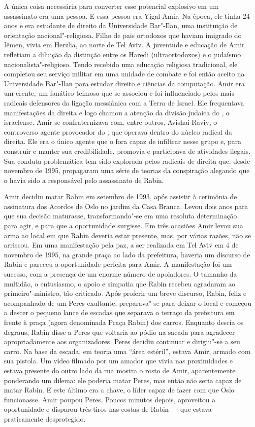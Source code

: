 A única coisa necessária para converter esse potencial explosivo em um
assassinato era uma pessoa. E essa pessoa era Yigal Amir. Na época, ele
tinha 24 anos e era estudante de direito da Universidade
Bar"-Ilan, uma instituição de orientação nacional"-religiosa. Filho de
pais ortodoxos que haviam imigrado do Iêmen, vivia em Herzlia, ao
norte de Tel Aviv. A juventude e educação de Amir refletiam a diluição
da distinção entre os Haredi (ultraortodoxos) e o judaísmo
nacionalista"-religioso. Tendo recebido uma educação religiosa
tradicional, ele completou seu serviço militar em uma unidade de combate
e foi então aceito na Universidade Bar"-Ilan para estudar direito e
ciências da computação. Amir era um crente, um fanático teimoso que se
associou e foi influenciado pelos mais radicais defensores da ligação
messiânica com a Terra de Israel. Ele frequentava manifestações da
direita e logo chamou a atenção da divisão judaica do
,  
o  israelense. Amir se confraternizava com, entre outros, Avishai Raviv, o controverso agente provocador do , que operava dentro do
núcleo radical da direita. Ele era o único agente que o  fora capaz
de infiltrar nesse grupo e, para construir e manter sua credibilidade,
promovia e participava de atividades ilegais. Sua conduta problemática
tem sido explorada pelos radicais de direita que, desde novembro de
1995, propagaram uma série de teorias da conspiração alegando que o 
havia sido a responsável pelo assassinato de Rabin.

Amir decidiu matar Rabin em setembro de 1993, após assistir à cerimônia
de assinatura dos Acordos de Oslo no jardim da Casa Branca. Levou dois
anos para que sua decisão maturasse, transformando"-se em uma resoluta
determinação para agir, e para que a oportunidade surgisse. Em três
ocasiões Amir levou sua arma ao local em que Rabin deveria estar
presente, mas, por várias razões, não se arriscou. Em uma manifestação pela
paz, a ser realizada em Tel Aviv em 4 de novembro de 1995, na grande
praça ao lado da prefeitura, haveria um discurso de Rabin e pareceu a
oportunidade perfeita para Amir. A manifestação foi um sucesso, com a
presença de um enorme número de apoiadores. O tamanho da multidão, o
entusiasmo, o apoio e simpatia que Rabin recebeu agradaram ao primeiro"-ministro,
tão criticado. Após proferir um breve discurso, Rabin, feliz e
acompanhado de um Peres exultante, preparava"-se para deixar o local e
começou a descer o pequeno lance de escadas que separava o terraço da
prefeitura em frente à praça (agora denominada Praça Rabin) dos carros.
Enquanto descia os degraus, Rabin disse a Peres que voltaria ao pódio na
sacada para agradecer apropriadamente aos organizadores. Peres decidiu
continuar e dirigiu"-se a seu carro. Na base da escada, em teoria uma
``área estéril'', estava Amir, armado com sua pistola. Um vídeo filmado
por um amador que vivia nas proximidades e estava presente do outro lado da rua 
mostra o rosto de Amir, aparentemente ponderando um dilema: ele poderia
matar Peres, mas então não seria capaz de matar Rabin. E este último era a
chave, o líder capaz de fazer com que Oslo funcionasse. Amir poupou
Peres. Poucos minutos depois, aproveitou a oportunidade e disparou três
tiros nas costas de Rabin --- que estava praticamente desprotegido.

